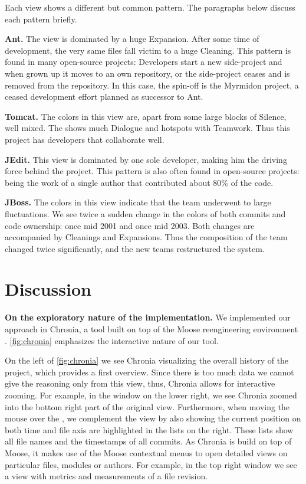 Each view shows a different but common pattern. The paragraphs below discuss each pattern briefly.

\textbf{Ant.} The view is dominated by a huge Expansion. After some time of development, the very same files fall victim to a huge Cleaning. This pattern is found in many open-source projects: Developers start a new side-project and when grown up it moves to an own repository, or the side-project ceases and is removed from the repository. In this case, the spin-off is the Myrmidon project, a ceased development effort planned as successor to Ant.

\textbf{Tomcat.} The colors in this view are, apart from some large blocks of Silence, well mixed. The \omap shows much Dialogue and hotspots with Teamwork. Thus this project has developers that  collaborate well.

\textbf{JEdit.} This view is dominated by one sole developer, making him the driving force behind the project. This pattern is also often found in open-source projects: being the work of a single author that contributed about 80\% of the code.

\textbf{JBoss.} The colors in this view indicate that the team underwent to large fluctuations. We see twice a sudden change in the colors of both commits and code ownership: once mid 2001 and once mid 2003. Both changes are accompanied by Cleanings and Expansions. Thus the composition of the team changed twice significantly, and the new teams restructured the system.

\section{Discussion}\label{sec:discussion}

\textbf{On the exploratory nature of the implementation.} We implemented our approach in Chronia, a tool built on top of the Moose reengineering environment \cite{Duca05a}. \autoref{fig:chronia} emphasizes the interactive nature of our tool.

On the left of \autoref{fig:chronia} we see Chronia visualizing the overall history of the project, which provides a first overview. Since there is too much data we cannot give the reasoning only from this view, thus, Chronia allows for interactive zooming. For example, in the window on the lower right, we see Chronia zoomed into the bottom right part of the original view. Furthermore, when moving the mouse over the \omap, we complement the view by also showing the current position on both time and file axis are highlighted in the lists on the right. These lists show all file names and the timestamps of all commits. As Chronia is build on top of Moose, it makes use of the Moose contextual menus to open detailed views on particular files, modules or authors. For example, in the top right window we see a view with metrics and measurements of a file revision.

